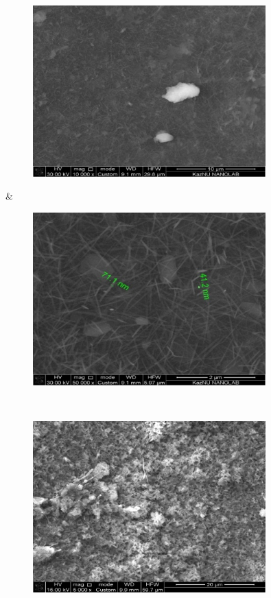 \begin{figure}[H]
	\centering
	\includegraphics[width=0.8\textwidth]{media/chem2/image95}
	\caption*{}
\end{figure}
 &
\begin{figure}[H]
	\centering
	\includegraphics[width=0.8\textwidth]{media/chem2/image96}
	\caption*{}
\end{figure}
 \\
\begin{figure}[H]
	\centering
	\includegraphics[width=0.8\textwidth]{media/chem2/image97.tiff}
	\caption*{}
\end{figure}
